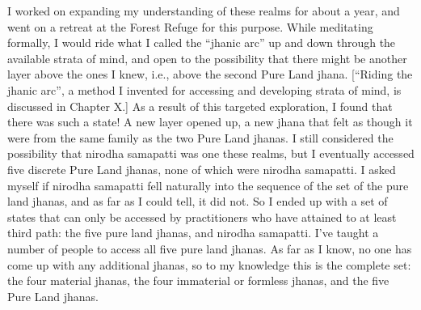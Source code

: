 \documentclass[a5paper,10pt,english]{book}
\begin{document}
\sphinxAtStartPar
I worked on expanding my understanding of these realms for about a year,
and went on a retreat at the Forest Refuge for this purpose. While
meditating formally, I would ride what I called the “jhanic arc” up and
down through the available strata of mind, and open to the possibility
that there might be another layer above the ones I knew, i.e., above the
second Pure Land jhana. {[}“Riding the jhanic arc”, a method I invented
for accessing and developing strata of mind, is discussed in Chapter X.{]}
As a result of this targeted exploration, I found that there was such a
state! A new layer opened up, a new jhana that felt as though it were
from the same family as the two Pure Land jhanas. I still considered the
possibility that nirodha samapatti was one these realms, but I
eventually accessed five discrete Pure Land jhanas, none of which were
nirodha samapatti. I asked myself if nirodha samapatti fell naturally
into the sequence of the set of the pure land jhanas, and as far as I
could tell, it did not. So I ended up with a set of states that can only
be accessed by practitioners who have attained to at least third path:
the five pure land jhanas, and nirodha samapatti. I’ve taught a number
of people to access all five pure land jhanas. As far as I know, no one
has come up with any additional jhanas, so to my knowledge this is the
complete set: the four material jhanas, the four immaterial or formless
jhanas, and the five Pure Land jhanas.
\end{document}
